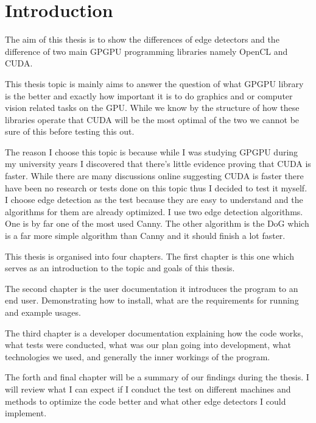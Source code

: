 \chapter{Introduction}
\label{chap:intro}

The aim of this thesis is to show the differences of edge detectors and the difference of two main \ac{GPGPU} programming libraries namely OpenCL and CUDA.

This thesis topic is mainly aims to answer the question of what \ac{GPGPU} library is the better and exactly how important it is to do graphics and or computer vision related tasks on the \ac{GPU}. While we know by the structure of how these libraries operate that CUDA will be the most optimal of the two we cannot be sure of this before testing this out.

The reason I choose this topic is because while I was studying \ac{GPGPU} during my university years I discovered that there's little evidence proving that CUDA is faster. While there are many discussions online suggesting CUDA is faster there have been no research or tests done on this topic thus I decided to test it myself. I choose edge detection as the test because they are easy to understand and the algorithms for them are already optimized. I use two edge detection algorithms. One is by far one of the most used \ac{Canny}. The other algorithm is the \ac{DoG} which is a far more simple algorithm than \ac{Canny} and it should finish a lot faster.

This thesis is organised into four chapters. The first chapter is this one which serves as an introduction to the topic and goals of this thesis.

The second chapter is the user documentation it introduces the program to an end user. Demonstrating how to install, what are the requirements for running and example usages.

The third chapter is a developer documentation explaining how the code works, what tests were conducted, what was our plan going into development, what technologies we used, and generally the inner workings of the program.

The forth and final chapter will be a summary of our findings during the thesis. I will review what I can expect if I conduct the test on different machines and methods to optimize the code better and what other edge detectors I could implement.